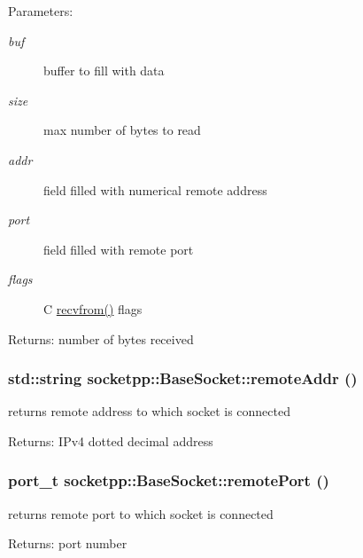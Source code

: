 \begin{CompactItemize}
\begin{Desc}
\item[Parameters:]
\begin{description}
\item[{\em buf}]buffer to fill with data \item[{\em size}]max number of bytes to read \item[{\em addr}]field filled with numerical remote address \item[{\em port}]field filled with remote port \item[{\em flags}]C \hyperlink{classsocketpp_1_1BaseSocket_6a207860c0a1328dc05bea32bb62e81f}{recvfrom()} flags \end{description}
\end{Desc}
\begin{Desc}
\item[Returns:]number of bytes received \end{Desc}
\hypertarget{classsocketpp_1_1BaseSocket_483c6186ae60d0c399983e14f55af600}{
\subsubsection[{remoteAddr}]{\setlength{\rightskip}{0pt plus 5cm}std::string socketpp::BaseSocket::remoteAddr ()}}
\label{classsocketpp_1_1BaseSocket_483c6186ae60d0c399983e14f55af600}


returns remote address to which socket is connected 

\begin{Desc}
\item[Returns:]IPv4 dotted decimal address \end{Desc}
\hypertarget{classsocketpp_1_1BaseSocket_039db642444d2111f2f58ebe032c5f5f}{
\subsubsection[{remotePort}]{\setlength{\rightskip}{0pt plus 5cm}port\_\-t socketpp::BaseSocket::remotePort ()}}
\label{classsocketpp_1_1BaseSocket_039db642444d2111f2f58ebe032c5f5f}


returns remote port to which socket is connected 

\begin{Desc}
\item[Returns:]port number \end{Desc}
\hypertarget{classsocketpp_1_1BaseSocket_8a5fa7a9374964d7978285a003301b9d}{
}
\end{CompactItemize}
